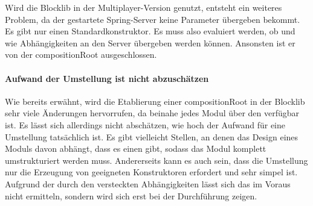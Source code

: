 Wird die Blocklib in der Multiplayer-Version genutzt, entsteht ein weiteres Problem, da der gestartete Spring-Server keine Parameter übergeben bekommt. Es gibt nur einen Standardkonstruktor. Es muss also evaluiert werden, ob und wie Abhängigkeiten an den Server übergeben werden können. Ansonsten ist er von der \gls{compositionRoot} ausgeschlossen.

\paragraph{Aufwand der Umstellung ist nicht abzuschätzen}
Wie bereits erwähnt, wird die Etablierung einer \gls{compositionRoot} in der Blocklib sehr viele Änderungen hervorrufen, da beinahe jedes Modul über den  verfügbar ist. Es lässt sich allerdings nicht abschätzen, wie hoch der Aufwand für eine Umstellung tatsächlich ist. Es gibt vielleicht Stellen, an denen das Design eines Moduls davon abhängt, dass es einen  gibt, sodass das Modul komplett umstrukturiert werden muss. Andererseits kann es auch sein, dass die Umstellung nur die Erzeugung von geeigneten Konstruktoren erfordert und sehr simpel ist. Aufgrund der durch den  versteckten Abhängigkeiten lässt sich das im Voraus nicht ermitteln, sondern wird sich erst bei der Durchführung zeigen.
